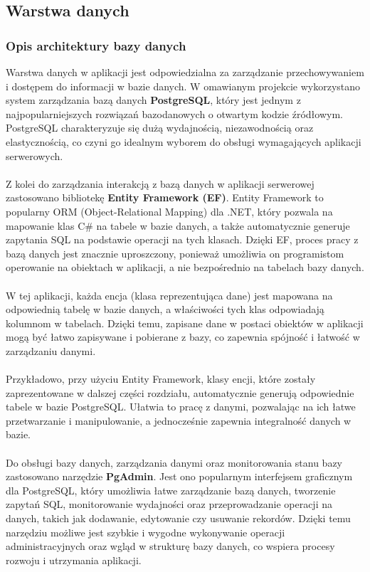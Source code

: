 \documentclass[12pt,a4paper]{article}
\begin{document}
\newpage

\subsection{Warstwa danych}
\subsubsection{Opis architektury bazy danych}

Warstwa danych w aplikacji jest odpowiedzialna za zarządzanie przechowywaniem i dostępem do informacji w bazie danych. W omawianym projekcie wykorzystano system zarządzania bazą danych \textbf{PostgreSQL}, który jest jednym z najpopularniejszych rozwiązań bazodanowych o otwartym kodzie źródłowym. PostgreSQL charakteryzuje się dużą wydajnością, niezawodnością oraz elastycznością, co czyni go idealnym wyborem do obsługi wymagających aplikacji serwerowych.
\\\\
Z kolei do zarządzania interakcją z bazą danych w aplikacji serwerowej zastosowano bibliotekę \textbf{Entity Framework (EF)}. Entity Framework to popularny ORM (Object-Relational Mapping) dla .NET, który pozwala na mapowanie klas C\# na tabele w bazie danych, a także automatycznie generuje zapytania SQL na podstawie operacji na tych klasach. Dzięki EF, proces pracy z bazą danych jest znacznie uproszczony, ponieważ umożliwia on programistom operowanie na obiektach w aplikacji, a nie bezpośrednio na tabelach bazy danych.
\\\\
W tej aplikacji, każda encja (klasa reprezentująca dane) jest mapowana na odpowiednią tabelę w bazie danych, a właściwości tych klas odpowiadają kolumnom w tabelach. Dzięki temu, zapisane dane w postaci obiektów w aplikacji mogą być łatwo zapisywane i pobierane z bazy, co zapewnia spójność i łatwość w zarządzaniu danymi.
\\\\
Przykładowo, przy użyciu Entity Framework, klasy encji, które zostały zaprezentowane w dalszej części rozdziału, automatycznie generują odpowiednie tabele w bazie PostgreSQL. Ułatwia to pracę z danymi, pozwalając na ich łatwe przetwarzanie i manipulowanie, a jednocześnie zapewnia integralność danych w bazie.
\\\\
Do obsługi bazy danych, zarządzania danymi oraz monitorowania stanu bazy zastosowano narzędzie \textbf{PgAdmin}. Jest ono popularnym interfejsem graficznym dla PostgreSQL, który umożliwia łatwe zarządzanie bazą danych, tworzenie zapytań SQL, monitorowanie wydajności oraz przeprowadzanie operacji na danych, takich jak dodawanie, edytowanie czy usuwanie rekordów. Dzięki temu narzędziu możliwe jest szybkie i wygodne wykonywanie operacji administracyjnych oraz wgląd w strukturę bazy danych, co wspiera procesy rozwoju i utrzymania aplikacji.
\end{document}
